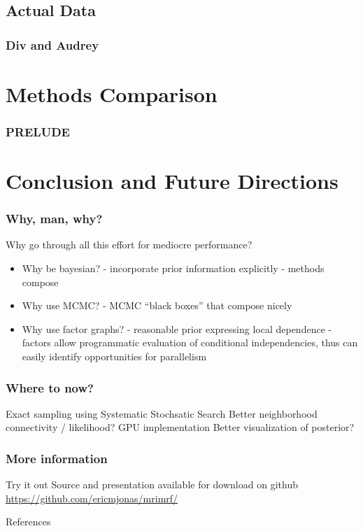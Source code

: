 \documentclass{beamer}
\begin{document}
\subsection{Actual Data}
\begin{frame}
  \frametitle{Div and Audrey}
\end{frame}

\section{Methods Comparison}
\begin{frame}
  \frametitle{PRELUDE}
\end{frame}

\section{Conclusion and Future Directions}
\begin{frame}
  \frametitle{Why, man, why?}
  Why go through all this effort for mediocre performance? 
  \begin{itemize}
    \item Why be bayesian?  
       - incorporate prior information explicitly
       - methods compose
    \item Why use MCMC? 
       - MCMC ``black boxes'' that compose nicely \cite{Bonawitz_Composable_2008}
    \item Why use factor graphs? 
       - reasonable prior expressing local dependence 
       - factors allow programmatic evaluation of conditional independencies, 
       thus can easily identify opportunities for parallelism
  \end{itemize}
  
\end{frame}

\begin{frame}
  \frametitle{Where to now?}
  Exact sampling using Systematic Stochsatic Search
  Better neighborhood connectivity / likelihood? 
  GPU implementation 
  Better visualization of posterior?
\end{frame}

\begin{frame}
  \frametitle{More information}
  \begin{block}{Try it out}
    Source and presentation available for download on github
    \url{https://github.com/ericmjonas/mrimrf/}
  \end{block}
\end{frame}



\begin{frame}[allowframebreaks]{References}

\end{frame} 
\end{document}
